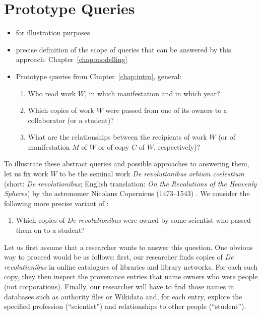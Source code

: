 \chapter{Prototype Queries}
\label{chap:prototype_queries}

\begin{itemize}
  \item
    for illustration purposes
  \item
    precise definition of the scope of queries that can be answered by this approach: Chapter~\ref{chap:modelling}
  \item
    Prototype queries from Chapter~\ref{chap:intro}, general:
    \begin{enumerate}
      \item[\exaquery{1}]
        Who read work $W$, in which manifestation and in which year?
      \item[\exaquery{2}]
        Which copies of work $W$ were passed from one of its owners to a collaborator (or a student)?
      \item[\exaquery{3}]
        What are the relationships between the recipients of work $W$
        (or of manifestation $M$ of $W$ or of copy $C$ of $W$, respectively)?
    \end{enumerate}
\end{itemize}
%
To illustrate these abstract queries and possible approaches to answering them, let us fix work $W$ to be the seminal work \emph{De revolutionibus orbium coelestium}
(short: \emph{De revolutionibus}; English translation: \emph{On the Revolutions of the Heavenly Spheres}) by the astronomer Nicolaus Copernicus (1473–1543) \cite{Kopernikus1543}.
We consider the following more precise variant of :
%
\begin{enumerate}
  \item[\exaquery{2$'$}]
    Which copies of \emph{De revolutionibus} were owned by some scientist who passed them on to a student?
\end{enumerate}
%
Let us first assume that a researcher wants to answer this question.
One obvious way to proceed would be as follows: first, our researcher finds copies of \emph{De revolutionibus} 
in online catalogues of libraries and library networks. For each such copy, they then inspect the provenance entries
that name owners who were people (not corporations). Finally, our researcher will have to find those names in databases such as
authority files or Wikidata and, for each entry, explore the specified profession (``scientist'') and relationships to other people (``student'').


